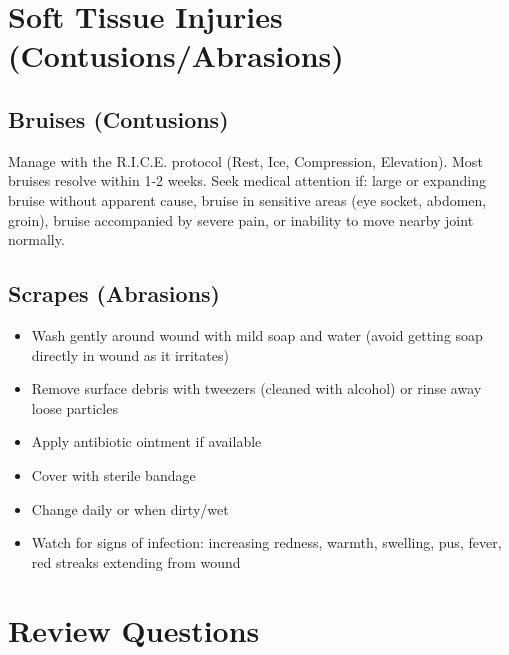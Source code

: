 \section{Soft Tissue Injuries (Contusions/Abrasions)}

\subsection{Bruises (Contusions)}

Manage with the R.I.C.E. protocol (Rest, Ice, Compression, Elevation). Most bruises resolve within 1-2 weeks. Seek medical attention if: large or expanding bruise without apparent cause, bruise in sensitive areas (eye socket, abdomen, groin), bruise accompanied by severe pain, or inability to move nearby joint normally.

\subsection{Scrapes (Abrasions)}

\begin{itemize}[leftmargin=*]
  \item Wash gently around wound with mild soap and water (avoid getting soap directly in wound as it irritates)
  \item Remove surface debris with tweezers (cleaned with alcohol) or rinse away loose particles
  \item Apply antibiotic ointment if available
  \item Cover with sterile bandage
  \item Change daily or when dirty/wet
  \item Watch for signs of infection: increasing redness, warmth, swelling, pus, fever, red streaks extending from wound
\end{itemize}

\section{Review Questions}

